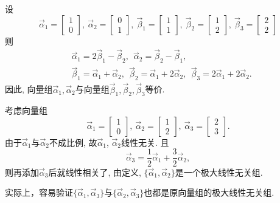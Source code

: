 \begin{eg}
设 $$\vec{\alpha}_1=\begin{bmatrix}1\\0\end{bmatrix},\ \vec{\alpha}_2=\begin{bmatrix}0\\1\end{bmatrix},\ \vec{\beta}_1=\begin{bmatrix}1\\1\end{bmatrix}, \ \vec{\beta}_2=\begin{bmatrix}1\\2\end{bmatrix}, \
\vec{\beta}_3=\begin{bmatrix}2\\2\end{bmatrix} $$
则\begin{displaymath}\begin{aligned}
&\vec{\alpha}_1=2\vec{\beta}_1-\vec{\beta}_2 , \ \ \vec{\alpha}_2=\vec{\beta}_2-\vec{\beta}_1,\\
& \vec{\beta}_1=\vec{\alpha}_1+\vec{\alpha}_2, \ \ \vec{\beta}_2=\vec{\alpha}_1+2\vec{\alpha}_2, \ \ \vec{\beta}_3=2\vec{\alpha}_1+2\vec{\alpha}_2.
\end{aligned}\end{displaymath}
因此, 向量组$\vec{\alpha}_1,\vec{\alpha}_2$与向量组$ \vec{\beta}_1, \vec{\beta}_2, \vec{\beta}_3$等价.
\end{eg}

\begin{eg}
考虑向量组$$\vec{\alpha}_1=\begin{bmatrix}1\\0\end{bmatrix},\ \vec{\alpha}_2=\begin{bmatrix}1\\2\end{bmatrix},\
\vec{\alpha}_3=\begin{bmatrix}2\\3\end{bmatrix}.$$
由于$\vec{\alpha}_1$与$\vec{\alpha}_2$不成比例, 故$\vec{\alpha}_1$, $\vec{\alpha}_2$线性无关. 且$$\vec{\alpha}_3=\frac{1}{2}\vec{\alpha}_1+\frac{3}{2}\vec{\alpha}_2,$$
则再添加$\vec{\alpha}_3$后就线性相关了, 由定义, $\{\vec{\alpha}_1, \vec{\alpha}_2\}$是一个极大线性无关组.

实际上，容易验证$\{\vec{\alpha}_1, \vec{\alpha}_3\}$与$\{\vec{\alpha}_2, \vec{\alpha}_3\}$也都是原向量组的极大线性无关组.
\end{eg}

